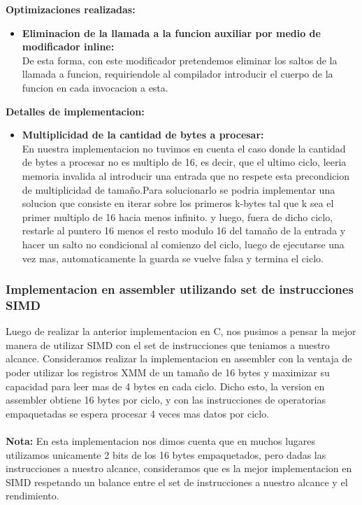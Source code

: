 \bigskip
\textbf{Optimizaciones realizadas:}
\begin{itemize}
    \item \textbf{Eliminacion de la llamada a la funcion auxiliar por medio de modificador inline:}\\
        De esta forma, con este modificador pretendemos eliminar los saltos de la llamada a funcion, requiriendole al compilador introducir el cuerpo de la funcion en cada invocacion a esta.
\end{itemize}

\bigskip
\textbf{Detalles de implementacion:}
\begin{itemize}
    \item \textbf{Multiplicidad de la cantidad de bytes a procesar:}\\
        En nuestra implementacion no tuvimos en cuenta el caso donde la cantidad de bytes a procesar no es multiplo de 16, es decir, que el ultimo ciclo, leeria memoria invalida al introducir una entrada que no respete esta precondicion de multiplicidad de tamaño.Para solucionarlo se podria implementar una solucion que consiste en iterar sobre los primeros k-bytes tal que k sea el primer multiplo de 16 hacia menos infinito. y luego, fuera de dicho ciclo, restarle al puntero 16 menos el resto modulo 16 del tamaño de la entrada y hacer un salto no condicional al comienzo del ciclo, luego de ejecutarse una vez mas, automaticamente la guarda se vuelve falsa y termina el ciclo.
\end{itemize}

\subsubsection{Implementacion en assembler utilizando set de instrucciones SIMD}

Luego de realizar la anterior implementacion en C, nos pusimos a pensar la mejor manera de utilizar SIMD con el set de instrucciones que teniamos a nuestro alcance.
Consideramos realizar la implementacion en assembler con la ventaja de poder utilizar los registros XMM de un tamaño de 16 bytes y maximizar su capacidad para leer mas de 4 bytes en cada ciclo. Dicho esto, la version en assembler obtiene 16 bytes por ciclo, y con las instrucciones de operatorias empaquetadas se espera procesar 4 veces mas datos por ciclo.\\
\\
\textbf{Nota: } En esta implementacion nos dimos cuenta que en muchos lugares utilizamos unicamente 2 bits de los 16 bytes empaquetados, pero dadas las instrucciones a nuestro alcance, consideramos que es la mejor implementacion en SIMD respetando un balance entre el set de instrucciones a nuestro alcance y el rendimiento.

